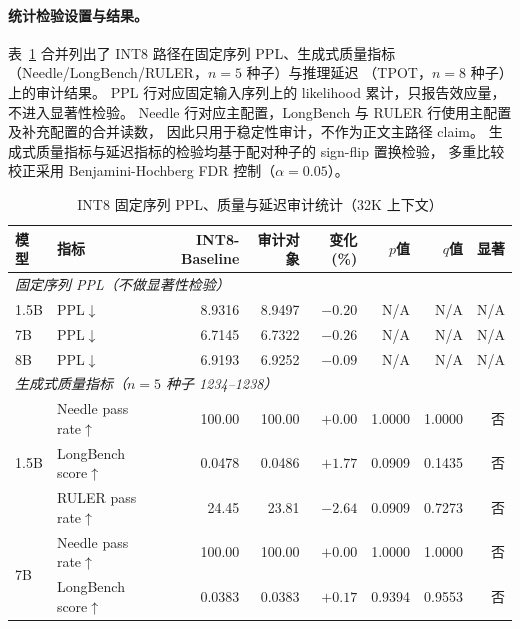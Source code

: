 \paragraph{统计检验设置与结果。}
\label{sec:app-seed-detail}

表~\ref{tab:app-sig-quality} 合并列出了 INT8 路径在固定序列 PPL、生成式质量指标
（Needle/LongBench/RULER，$n=5$ 种子）与推理延迟
（TPOT，$n=8$ 种子）上的审计结果。
PPL 行对应固定输入序列上的 likelihood 累计，只报告效应量，不进入显著性检验。
Needle 行对应主配置，LongBench 与 RULER 行使用主配置及补充配置的合并读数，
因此只用于稳定性审计，不作为正文主路径 claim。
生成式质量指标与延迟指标的检验均基于配对种子的 sign-flip 置换检验，
多重比较校正采用 Benjamini-Hochberg FDR 控制（$\alpha=0.05$）。

\begin{table}[!htbp]
  \centering
  \caption{INT8 固定序列 PPL、质量与延迟审计统计（32K 上下文）}
  \label{tab:app-sig-quality}
  \begin{tabular}{llrrrrrr}
    \toprule
    \textbf{模型} & \textbf{指标} & \textbf{INT8-Baseline} & \textbf{审计对象} & \textbf{变化(\%)} & \textbf{$p$值} & \textbf{$q$值} & \textbf{显著} \\
    \midrule
    \multicolumn{8}{l}{\textit{固定序列 PPL（不做显著性检验）}} \\
    \midrule
    1.5B & PPL$\downarrow$             & 8.9316 & 8.9497 & $-0.20$ & N/A & N/A & N/A \\
    7B   & PPL$\downarrow$             & 6.7145 & 6.7322 & $-0.26$ & N/A & N/A & N/A \\
    8B   & PPL$\downarrow$             & 6.9193 & 6.9252 & $-0.09$ & N/A & N/A & N/A \\
    \midrule
    \multicolumn{8}{l}{\textit{生成式质量指标（$n=5$ 种子 1234--1238）}} \\
    \midrule
    \multirow{3}{*}{1.5B}
      & Needle pass rate$\uparrow$   & 100.00 & 100.00 & $+0.00$ & 1.0000 & 1.0000 & 否 \\
      & LongBench score$\uparrow$    & 0.0478 & 0.0486 & $+1.77$ & 0.0909 & 0.1435 & 否 \\
      & RULER pass rate$\uparrow$    & 24.45  & 23.81  & $-2.64$ & 0.0909 & 0.7273 & 否 \\
    \midrule
    \multirow{3}{*}{7B}
      & Needle pass rate$\uparrow$   & 100.00 & 100.00 & $+0.00$ & 1.0000 & 1.0000 & 否 \\
      & LongBench score$\uparrow$    & 0.0383 & 0.0383 & $+0.17$ & 0.9394 & 0.9553 & 否 \\

\end{tabular}
\end{table}
